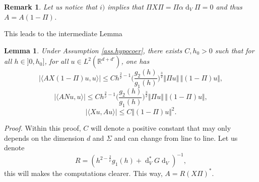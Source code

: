 \documentclass[12pt]{amsart}
\newcommand{\R}{\mathbb R}
\def\<{\langle}
\def\>{\rangle}
\newcommand{\bp}{{\it Proof. }}
\renewcommand{\d}{\operatorname{d}}
\numberwithin{equation}{section}
\numberwithin{figure}{section}
\newtheorem{lemma}[defin]{Lemma}
\newtheorem{remark}[defin]{Remark}
\begin{document}
\begin{remark}
    Let us notice that $i)$ implies that $\Pi X\Pi = \Pi\alpha\d_V\Pi = 0$ and %
thus $A = A(1-\Pi)$.
\end{remark}


This leads to the intermediate Lemma

\begin{lemma}\label{lem:bounds}
    Under Assumption \ref{ass.hypocoer}, there exists $C,h_0>0$ such that for all $h\in]0,h_0]$, for all $u\in L^2(\R^{d+d'})$, one %
has
    \begin{equation}\label{eq:maj1}
    |\<AX (1-\Pi)u,u\>|\leq Ch^{\frac{2}{\overline\nu}-1}\Big(\frac{g_2(h)}{g_1(h)}\Big)^{\frac32}\Vert \Pi u\Vert\, \Vert(1- \Pi) u\Vert,
    \end{equation}
    \begin{equation}\label{eq:maj2}
    |\<AN u,u\>|\leq Ch^{\frac{2}{\overline\nu}-1}\Big(\frac{g_2(h)}{g_1(h)}\Big)^{\frac32}\Vert \Pi u\Vert\, \Vert(1- \Pi) u\Vert,
    \end{equation}
    \begin{equation}\label{eq:maj3}
    |\<X u,A u\>|\leq C\Vert(1- \Pi) u\Vert^2.
    \end{equation}
\end{lemma}
\bp
Within this %
proof, $C$ will denote a positive constant that may only depends on the dimension $d$ and $\Sigma$ and can change from line to line. Let us denote
\begin{equation}\label{eq:defR}
R = (h^{2-\frac2{\overline{\nu}}}g_1(h) + \d_V^*G\d_V)^{-1},
\end{equation}
this will makes the computations clearer. This way, $A = R(X\Pi)^*$.
\end{document}
